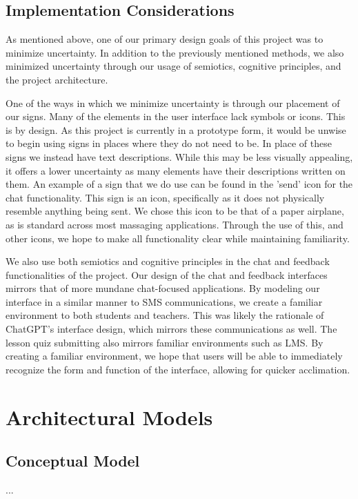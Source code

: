 \documentclass[12pt,a4paper]{article}
\begin{document}
    \subsection{Implementation Considerations}

    As mentioned above, one of our primary design goals of this project was to minimize uncertainty.
    In addition to the previously mentioned methods, we also minimized uncertainty through our
    usage of semiotics, cognitive principles, and the project architecture.

    One of the ways in which we minimize uncertainty is through our placement of our signs.  Many
    of the elements in the user interface lack symbols or icons.  This is by design.  As this project
    is currently in a prototype form, it would be unwise to begin using signs in places where they do
    not need to be.  In place of these signs we instead have text descriptions.  While this may be
    less visually appealing, it offers a lower uncertainty as many elements have their descriptions
    written on them.  An example of a sign that we do use can be found in the 'send' icon for the
    chat functionality.  This sign is an icon, specifically as it does not physically resemble anything
    being sent.  We chose this icon to be that of a paper airplane, as is standard across most
    massaging applications.  Through the use of this, and other icons, we hope to make all functionality
    clear while maintaining familiarity.

    We also use both semiotics and cognitive principles in the chat and feedback functionalities of
    the project.  Our design of the chat and feedback interfaces mirrors that of more mundane chat-focused
    applications.  By modeling our interface in a similar manner to SMS communications, we create a
    familiar environment to both students and teachers.  This was likely the rationale of ChatGPT's
    interface design, which mirrors these communications as well.  The lesson quiz submitting also
    mirrors familiar environments such as LMS.  By creating a familiar environment, we hope that users
    will be able to immediately recognize the form and function of the interface, allowing for
    quicker acclimation.

    \section{Architectural Models}

    \subsection{Conceptual Model}
    ...
\end{document}
